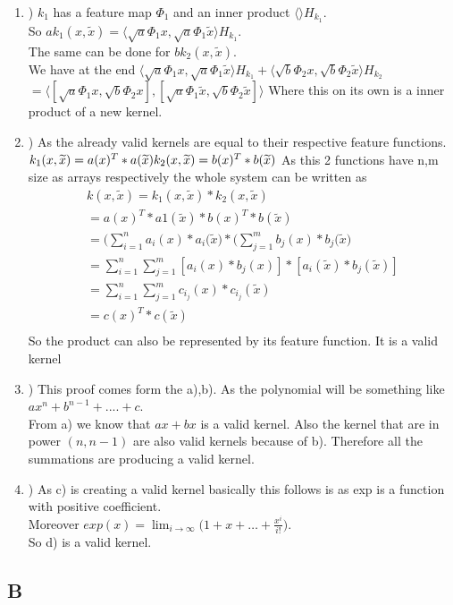 \begin{enumerate}[label=\alph*]
\item) $k_1$ has a feature map $\Phi_1$ and an inner product $\langle\rangle H_{k_1}$.\\
So $ak_1(x,\widetilde{x}) = \langle \sqrt{a}\Phi_1{x}, \sqrt{a}\Phi_1{\widetilde{x}} \rangle H_{k_1}$. \\
The same can be done for $bk_2(x,\widetilde{x})$.\\
We have at the end 
$\langle \sqrt{a}\Phi_1{x}, \sqrt{a}\Phi_1{\widetilde{x}} \rangle H_{k_1} + \langle \sqrt{b}\Phi_2{x}, \sqrt{b}\Phi_2{\widetilde{x}} \rangle H_{k_2}$\\
$= \langle [\sqrt{a}\Phi_1{x},\sqrt{b}\Phi_2{x}], [\sqrt{a}\Phi_1{\widetilde{x}},\sqrt{b}\Phi_2{\widetilde{x}}] \rangle$
Where this on its own is a inner product of a new kernel.
\item) As the already valid kernels are equal to their respective feature functions.
$k_1(x,\widetilde{x}) = a(x)^T*a(\widetilde{x})\\
k_2(x,\widetilde{x}) = b(x)^T*b(\widetilde{x})$
As this 2 functions have n,m size as arrays respectively the whole system can be written as
\begin{align*}
k(x,\widetilde{x}) = k_1(x,\widetilde{x})*k_2(x,\widetilde{x})\\
		   = a(x)^T*a1(\widetilde{x}) * b(x)^T*b(\widetilde{x})\\
		   = \Big( \sum_{i=1}^{n} a_i(x)*a_i(\widetilde{x} \Big)*\Big( \sum_{j=1}^{m} b_j(x)*b_j(\widetilde{x} \Big)\\
		   = \sum_{i=1}^{n}\sum_{j=1}^{m}[a_i(x)*b_j(x)] * [a_i(\widetilde{x})*b_j(\widetilde{x})]\\
		   = \sum_{i=1}^{n}\sum_{j=1}^{m} c_{i_j}(x)*c_{i_j}(\widetilde{x})\\
		   = c(x)^T*c(\widetilde{x})\\
\end{align*}
So the product can also be represented by its feature function. It is a valid kernel
\item) This proof comes form the a),b). As the polynomial will be something like $ax^n+b^{n-1}+....+c$.\\
From a) we know that $ax+bx$ is a valid kernel. Also the kernel that are in power $(n,n-1)$ are also valid kernels
because of b). Therefore all the summations are producing a valid kernel.
\item) As c) is creating a valid kernel basically this follows is as exp is a function with positive coefficient.\\
Moreover $exp(x) = \lim_{i \to \infty} \big( 1+x+ \ldots + \frac{x^i}{i!} \big)$.\\
So d) is a valid kernel.
\end{enumerate}
\subsection{B}
